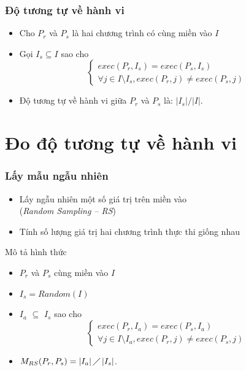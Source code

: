 \documentclass{beamer}
\begin{document}
\begin{frame}
  \frametitle{Độ tương tự về hành vi}
  \begin{block}{}
  	\begin{itemize}
  		\item Cho $P_r$ và $P_s$ là hai chương trình có cùng miền
  		vào $I$
  		\item Gọi $I_{s} \subseteq I$ sao cho 
  		\[\begin{cases}
  			exec(P_r, I_{s}) = exec(P_s, I_{s})\\
  			\forall j \in I \setminus I_{s}, exec(P_r, j) \neq exec(P_s, j)			
  		\end{cases}
  		\]
  		\item Độ tương tự về hành vi giữa $P_r$ và $P_s$ là: $|I_s|/|I|$.
  	\end{itemize}
  \end{block}
  
\end{frame}


\section{Đo độ tương tự về hành vi}
\begin{frame}
  \frametitle{Lấy mẫu ngẫu nhiên}
  \begin{itemize}  	
  	\item Lấy ngẫu nhiên một số giá trị trên miền vào \\(\emph{Random
  		Sampling -- RS})
  	\item Tính số lượng giá trị hai chương trình
  	thực thi giống nhau
  \end{itemize}
  	\begin{block}{Mô tả hình thức}
	\begin{itemize}
		\item $P_r$ và $P_s$ cùng miền vào $I$
		\item $I_{s} = Random(I)$
		\item $I_{a}$ $\subseteq $	$I_{s}$ sao cho
		\[\begin{cases}
		exec(P_r, I_{a}) = exec(P_s, I_{a})\\
		\forall j \in I \setminus I_{a}, exec(P_r, j) \neq exec(P_s, j)			
		\end{cases}
		\]		
		\item $M_{RS}(P_r, P_s) = \left|I_{a}\right| \diagup
		\left|I_{s}\right| $.
	\end{itemize}
	
	\end{block}

\end{frame}
\end{document}
